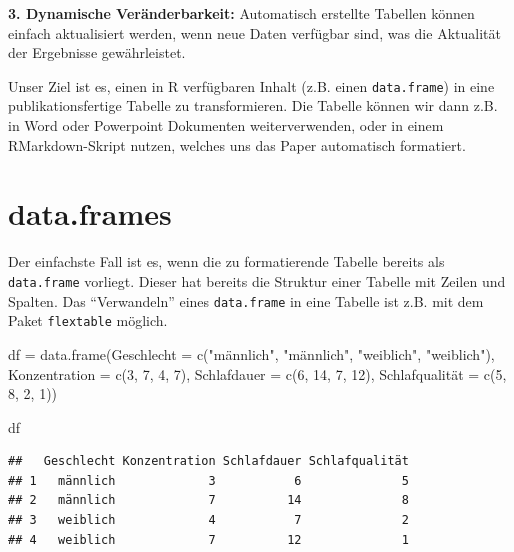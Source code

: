 \documentclass[
]{book}
\newenvironment{Shaded}{\begin{snugshade}}{\end{snugshade}}
\newcommand{\AttributeTok}[1]{\textcolor[rgb]{0.77,0.63,0.00}{#1}}
\newcommand{\DecValTok}[1]{\textcolor[rgb]{0.00,0.00,0.81}{#1}}
\newcommand{\FunctionTok}[1]{\textcolor[rgb]{0.00,0.00,0.00}{#1}}
\newcommand{\NormalTok}[1]{#1}
\newcommand{\OtherTok}[1]{\textcolor[rgb]{0.56,0.35,0.01}{#1}}
\newcommand{\StringTok}[1]{\textcolor[rgb]{0.31,0.60,0.02}{#1}}
\begin{document}
\textbf{3. Dynamische Veränderbarkeit:} Automatisch erstellte Tabellen können einfach aktualisiert werden, wenn neue Daten verfügbar sind, was die Aktualität der Ergebnisse gewährleistet.

Unser Ziel ist es, einen in R verfügbaren Inhalt (z.B. einen \texttt{data.frame}) in eine publikationsfertige Tabelle zu transformieren. Die Tabelle können wir dann z.B. in Word oder Powerpoint Dokumenten weiterverwenden, oder in einem RMarkdown-Skript nutzen, welches uns das Paper automatisch formatiert.

\hypertarget{data.frames}{%
\section{data.frames}\label{data.frames}}

Der einfachste Fall ist es, wenn die zu formatierende Tabelle bereits als \texttt{data.frame} vorliegt. Dieser hat bereits die Struktur einer Tabelle mit Zeilen und Spalten. Das ``Verwandeln'' eines \texttt{data.frame} in eine Tabelle ist z.B. mit dem Paket \texttt{flextable} möglich.

\begin{Shaded}
\begin{Highlighting}[]
\NormalTok{df }\OtherTok{=} \FunctionTok{data.frame}\NormalTok{(}\AttributeTok{Geschlecht =} \FunctionTok{c}\NormalTok{(}\StringTok{"männlich"}\NormalTok{, }\StringTok{"männlich"}\NormalTok{, }\StringTok{"weiblich"}\NormalTok{, }\StringTok{"weiblich"}\NormalTok{),}
                \AttributeTok{Konzentration =} \FunctionTok{c}\NormalTok{(}\DecValTok{3}\NormalTok{, }\DecValTok{7}\NormalTok{, }\DecValTok{4}\NormalTok{, }\DecValTok{7}\NormalTok{),}
                \AttributeTok{Schlafdauer =} \FunctionTok{c}\NormalTok{(}\DecValTok{6}\NormalTok{, }\DecValTok{14}\NormalTok{, }\DecValTok{7}\NormalTok{, }\DecValTok{12}\NormalTok{),}
\NormalTok{                Schlafqualität }\OtherTok{=} \FunctionTok{c}\NormalTok{(}\DecValTok{5}\NormalTok{, }\DecValTok{8}\NormalTok{, }\DecValTok{2}\NormalTok{, }\DecValTok{1}\NormalTok{))}

\NormalTok{df}
\end{Highlighting}
\end{Shaded}

\begin{verbatim}
##   Geschlecht Konzentration Schlafdauer Schlafqualität
## 1   männlich             3           6              5
## 2   männlich             7          14              8
## 3   weiblich             4           7              2
## 4   weiblich             7          12              1
\end{verbatim}
\end{document}
